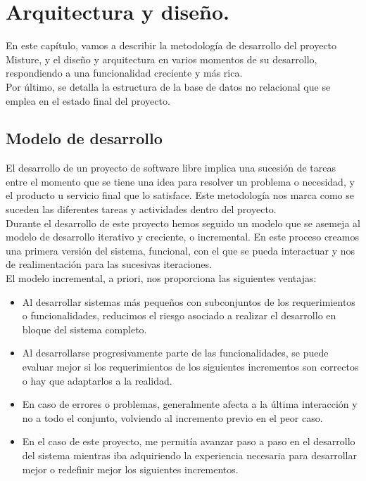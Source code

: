 \cleardoublepage
\chapter{Arquitectura y diseño.}
\label{chap:design_implement}

En este capítulo, vamos a describir la metodología de desarrollo del proyecto Misture, y el diseño y arquitectura en varios momentos de su desarrollo, respondiendo a una funcionalidad creciente y más rica.\\


Por último, se detalla la estructura de la base de datos no relacional que se emplea en el estado final del proyecto.\\


\section{Modelo de desarrollo} 
\label{subsec:modelo_desarrollo}

El desarrollo de un proyecto de software libre implica una sucesión de tareas entre el momento que se tiene una idea para resolver un problema o necesidad, y el producto u servicio final que lo satisface. Este metodología nos marca como se suceden las diferentes tareas y actividades dentro del proyecto.\\


Durante el desarrollo de este proyecto hemos seguido un modelo que se asemeja al modelo de desarrollo iterativo y creciente, o incremental.  En este proceso creamos una primera versión del sistema, funcional, con el que se pueda interactuar y nos de realimentación para las sucesivas iteraciones.\\


El modelo incremental, a priori, nos proporciona las siguientes ventajas:\\

\begin{itemize}
\item Al desarrollar sistemas más pequeños con subconjuntos de los requerimientos o funcionalidades, reducimos el riesgo asociado a realizar el desarrollo en bloque del sistema completo.

\item Al desarrollarse progresivamente parte de las funcionalidades, se puede evaluar mejor si los requerimientos de los siguientes incrementos son correctos o hay que adaptarlos a la realidad.

\item En caso de errores o problemas, generalmente afecta a la última interacción y no a todo el conjunto, volviendo al incremento previo en el peor caso.

\item En el caso de este proyecto, me permitía avanzar paso a paso en el desarrollo del sistema mientras iba adquiriendo la experiencia necesaria para desarrollar mejor o redefinir mejor los siguientes incrementos.
\end{itemize}


